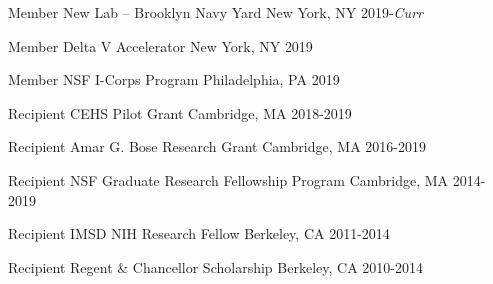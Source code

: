 


\begin{cvhonors}

  \cvhonor
    {Member} %
    {\enspace{}New Lab -- Brooklyn Navy Yard} %
    {New York, NY} %
    {2019-\textit{Curr}} %

  \cvhonor
    {Member} %
    {\enspace{}Delta V Accelerator} %
    {New York, NY} %
    {\qquad{}2019} %

  \cvhonor
    {Member} %
    {\enspace{}NSF I-Corps Program} %
    {Philadelphia, PA} %
    {\qquad{}2019} %

  \cvhonor
    {Recipient} %
    {CEHS Pilot Grant} %
    {Cambridge, MA} %
    {2018-2019} %

  \cvhonor
    {Recipient} %
    {Amar G. Bose Research Grant} %
    {Cambridge, MA} %
    {2016-2019} %

  \cvhonor
    {Recipient} %
    {NSF Graduate Research Fellowship Program} %
    {Cambridge, MA} %
    {2014-2019} %

  \cvhonor
    {Recipient} %
    {IMSD NIH Research Fellow} %
    {Berkeley, CA} %
    {2011-2014} %

  \cvhonor
    {Recipient} %
    {Regent \& Chancellor Scholarship} %
    {Berkeley, CA} %
    {2010-2014} %

\end{cvhonors}

